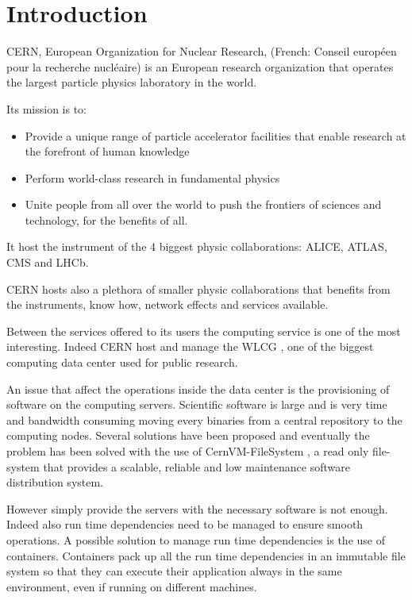 \chapter{Introduction}\label{ch:introduction}

CERN, European Organization for Nuclear Research, (French: Conseil européen
pour la recherche nucléaire) is an European research organization that operates
the largest particle physics laboratory in the world.

Its mission is to:
\begin{itemize}
	\item Provide a unique range of particle accelerator facilities that enable research at the forefront of human knowledge
	\item Perform world-class research in fundamental physics
	\item Unite people from all over the world to push the frontiers of sciences and technology, for the benefits of all.
\end{itemize}

It host the instrument of the 4 biggest physic collaborations: ALICE, ATLAS,
CMS and LHCb.

CERN hosts also a plethora of smaller physic collaborations that benefits from
the instruments, know how, network effects and services available.

Between the services offered to its users the computing service is one of the
most interesting. Indeed CERN host and manage the WLCG \cite{grid:website}, one
of the biggest computing data center used for public research.

An issue that affect the operations inside the data center is the provisioning
of software on the computing servers. Scientific software is large and is very
time and bandwidth consuming moving every binaries from a central repository to
the computing nodes.  Several solutions have been proposed and eventually the
problem has been solved with the use of CernVM-FileSystem \cite{cvmfs}, a read
only file-system that provides a scalable, reliable and low maintenance
software distribution system.

However simply provide the servers with the necessary software is not enough.
Indeed also run time dependencies need to be managed to ensure smooth
operations. A possible solution to manage run time dependencies is the use of
containers. Containers pack up all the run time dependencies in an immutable
file system so that they can execute their application always in the same
environment, even if running on different machines. 

